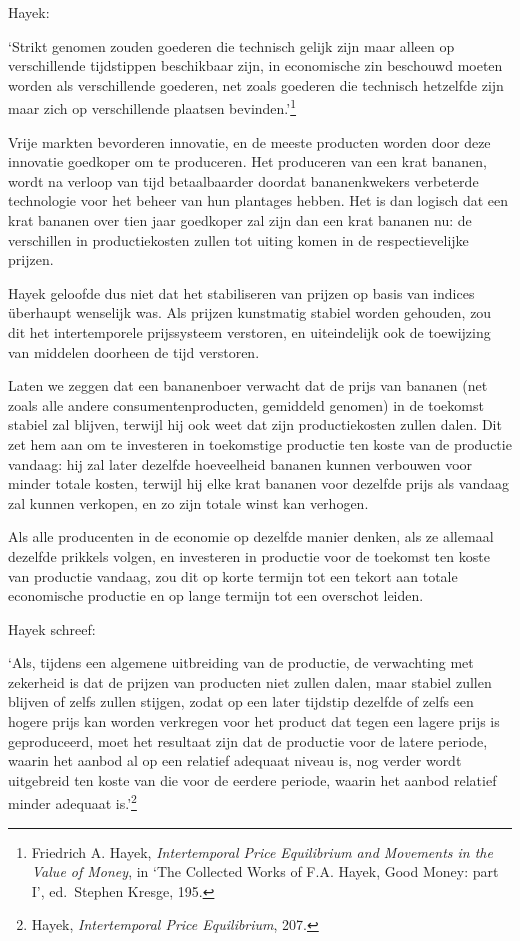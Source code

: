 \documentclass[
  a5paper,
  smalldemyvopaper,11pt,twoside,onecolumn,openright,extrafontsizes,
hidelinks]{memoir}
\renewenvironment{quote}%
               {\list{}{\rightmargin=.3cm\leftmargin=.3cm}%
                \itshape \item[]}%
               {\endlist}
\begin{document}
Hayek:

\begin{quote}
`Strikt genomen zouden goederen die technisch gelijk zijn maar alleen op
verschillende tijdstippen beschikbaar zijn, in economische zin beschouwd
moeten worden als verschillende goederen, net zoals goederen die
technisch hetzelfde zijn maar zich op verschillende plaatsen
bevinden.'\footnote{\hspace{0pt}Friedrich A. Hayek, \emph{Intertemporal
  Price Equilibrium and Movements in the Value of Money}, in `The
  Collected Works of F.A. Hayek, Good Money: part I', ed.~Stephen
  Kresge, 195.}
\end{quote}

Vrije markten bevorderen innovatie, en de meeste producten worden door
deze innovatie goedkoper om te produceren. Het produceren van een krat
bananen, wordt na verloop van tijd betaalbaarder doordat bananenkwekers
verbeterde technologie voor het beheer van hun plantages hebben. Het is
dan logisch dat een krat bananen over tien jaar goedkoper zal zijn dan
een krat bananen nu: de verschillen in productiekosten zullen tot uiting
komen in de respectievelijke prijzen.

Hayek geloofde dus niet dat het stabiliseren van prijzen op basis van
indices überhaupt wenselijk was. Als prijzen kunstmatig stabiel worden
gehouden, zou dit het intertemporele prijssysteem verstoren, en
uiteindelijk ook de toewijzing van middelen doorheen de tijd verstoren.

Laten we zeggen dat een bananenboer verwacht dat de prijs van bananen
(net zoals alle andere consumentenproducten, gemiddeld genomen) in de
toekomst stabiel zal blijven, terwijl hij ook weet dat zijn
productiekosten zullen dalen. Dit zet hem aan om te investeren in
toekomstige productie ten koste van de productie vandaag: hij zal later
dezelfde hoeveelheid bananen kunnen verbouwen voor minder totale kosten,
terwijl hij elke krat bananen voor dezelfde prijs als vandaag zal kunnen
verkopen, en zo zijn totale winst kan verhogen.

Als alle producenten in de economie op dezelfde manier denken, als ze
allemaal dezelfde prikkels volgen, en investeren in productie voor de
toekomst ten koste van productie vandaag, zou dit op korte termijn tot
een tekort aan totale economische productie en op lange termijn tot een
overschot leiden.

Hayek schreef:

\begin{quote}
`Als, tijdens een algemene uitbreiding van de productie, de verwachting
met zekerheid is dat de prijzen van producten niet zullen dalen, maar
stabiel zullen blijven of zelfs zullen stijgen, zodat op een later
tijdstip dezelfde of zelfs een hogere prijs kan worden verkregen voor
het product dat tegen een lagere prijs is geproduceerd, moet het
resultaat zijn dat de productie voor de latere periode, waarin het
aanbod al op een relatief adequaat niveau is, nog verder wordt
uitgebreid ten koste van die voor de eerdere periode, waarin het aanbod
relatief minder adequaat is.'\footnote{\hspace{0pt}Hayek,
  \emph{Intertemporal Price Equilibrium}, 207.}
\end{quote}
\end{document}
